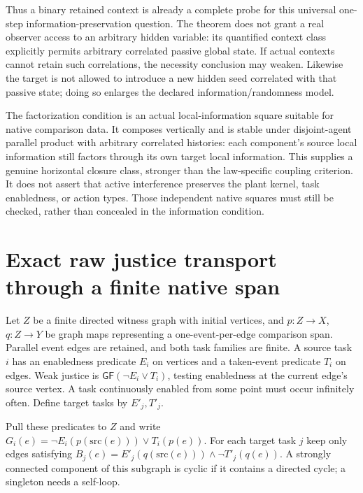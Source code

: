 \documentclass[11pt]{article}
\begin{document}
Thus a binary retained context is already a complete probe for this universal one-step information-preservation question. The theorem does not grant a real observer access to an arbitrary hidden variable: its quantified context class explicitly permits arbitrary correlated passive global state. If actual contexts cannot retain such correlations, the necessity conclusion may weaken. Likewise the target is not allowed to introduce a new hidden seed correlated with that passive state; doing so enlarges the declared information/randomness model.

The factorization condition is an actual local-information square suitable for native comparison data. It composes vertically and is stable under disjoint-agent parallel product with arbitrary correlated histories: each component's source local information still factors through its own target local information. This supplies a genuine horizontal closure class, stronger than the law-specific coupling criterion. It does not assert that active interference preserves the plant kernel, task enabledness, or action types. Those independent native squares must still be checked, rather than concealed in the information condition.

\section{Exact raw justice transport through a finite native span}
Let $Z$ be a finite directed witness graph with initial vertices, and $p:Z\to X$, $q:Z\to Y$ be graph maps representing a one-event-per-edge comparison span. Parallel event edges are retained, and both task families are finite. A source task $i$ has an enabledness predicate $E_i$ on vertices and a taken-event predicate $T_i$ on edges. Weak justice is $\mathsf{GF}(\neg E_i\lor T_i)$, testing enabledness at the current edge's source vertex. A task continuously enabled from some point must occur infinitely often. Define target tasks by $E'_j,T'_j$.

Pull these predicates to $Z$ and write $G_i(e)=\neg E_i(p(\mathrm{src}(e)))\lor T_i(p(e))$. For each target task $j$ keep only edges satisfying $B_j(e)=E'_j(q(\mathrm{src}(e)))\land\neg T'_j(q(e))$. A strongly connected component of this subgraph is cyclic if it contains a directed cycle; a singleton needs a self-loop.
\end{document}
